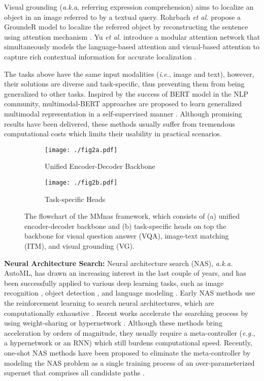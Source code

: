 \documentclass[sigconf]{acmart}
\begin{document}
Visual grounding (\emph{a.k.a}, referring expression comprehension) aims to localize an object in an image referred to by a textual query. Rohrbach \emph{et al.} propose a GroundeR model to localize the referred object by reconstructing the sentence using attention mechanism \cite{rohrbach2016grounding}. Yu \emph{et al.} introduce a modular attention network that simultaneously models the language-based attention and visual-based attention to capture rich contextual information for accurate localization \cite{yu2018mattnet}.

The tasks above have the same input modalities (\emph{i.e.}, image and text), however, their solutions are diverse and task-specific, thus preventing them from being generalized to other tasks. Inspired by the success of BERT model \cite{devlin2019bert} in the NLP community, multimodal-BERT approaches are proposed to learn generalized multimodal representation in a self-supervised manner \cite{tan2019lxmert, chen2019uniter, lu2019vilbert, li2019visualbert}. Although promising results have been delivered, these methods usually suffer from tremendous computational costs which limits their usability in practical scenarios.

\captionsetup[subfigure]{font=small}
\begin{figure*}
    \centering
    \begin{subfigure}[h]{0.62\linewidth} \texttt{[image: ./fig2a.pdf]}
        \caption{Unified Encoder-Decoder Backbone}\label{fig:backbone}
    \end{subfigure}
        \begin{subfigure}[h]{0.36\linewidth} \texttt{[image: ./fig2b.pdf]}
        \caption{Task-specific Heads}\label{fig:heads}
    \end{subfigure}
\caption{The flowchart of the MMnas framework, which consists of (a) unified encoder-decoder backbone and (b) task-specific heads on top the backbone for visual question answer (VQA), image-text matching (ITM), and visual grounding (VG).}
    \label{fig:medn}
\end{figure*}

\noindent\textbf{Neural Architecture Search:} Neural architecture search (NAS), \emph{a.k.a.} AutoML, has drawn an increasing interest in the last couple of years, and has been successfully applied to various deep learning tasks, such as image recognition \cite{zoph2018learning}, object detection \cite{ghiasi2019fpn}, and language modeling \cite{so2019evolved}. Early NAS methods use the reinforcement learning to search neural architectures, which are computationally exhaustive \cite{zoph2016neural, zoph2018learning}. Recent works accelerate the searching process by using weight-sharing \cite{pham2018efficient} or hypernetwork \cite{brock2018smash}. Although these methods bring acceleration by orders of magnitude, they usually require a meta-controller (\emph{e.g.}, a hypernetwork or an RNN) which still burdens computational speed. Recently, one-shot NAS methods have been proposed to eliminate the meta-controller by modeling the NAS problem as a single training process of an over-parameterized supernet that comprises all candidate paths \cite{bender2018understanding, liu2018darts, xu2019pc, cai2018proxylessnas}.
\end{document}
